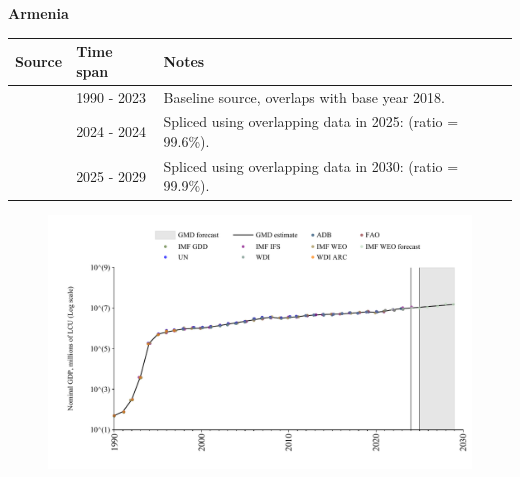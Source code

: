 \documentclass[12pt,a4paper,landscape]{article}
\begin{document}
\begin{adjustbox}{max totalsize={\paperwidth}{\paperheight},center}
\begin{minipage}[t][\textheight][t]{\textwidth}
\vspace*{0.5cm}
{}
\begin{center}
{\Large\bfseries Armenia}
\end{center}
\vspace{0.5cm}
\begin{table}[H]
\centering
\small
\begin{tabular}{|l|l|l|}
\hline
\textbf{Source} & \textbf{Time span} & \textbf{Notes} \\
\hline
\rowcolor{white}\cite{WDI}& 1990 - 2023 &Baseline source, overlaps with base year 2018.\\
\rowcolor{lightgray}\cite{IMF_IFS}& 2024 - 2024 &Spliced using overlapping data in 2025: (ratio = 99.6\%).\\
\rowcolor{white}\cite{IMF_WEO_forecast}& 2025 - 2029 &Spliced using overlapping data in 2030: (ratio = 99.9\%).\\
\hline
\end{tabular}
\end{table}
\begin{figure}[H]
\centering
\includegraphics[width=\textwidth,height=0.6\textheight,keepaspectratio]{graphs/ARM_nGDP.pdf}
\end{figure}
\end{minipage}
\end{adjustbox}
\end{document}
